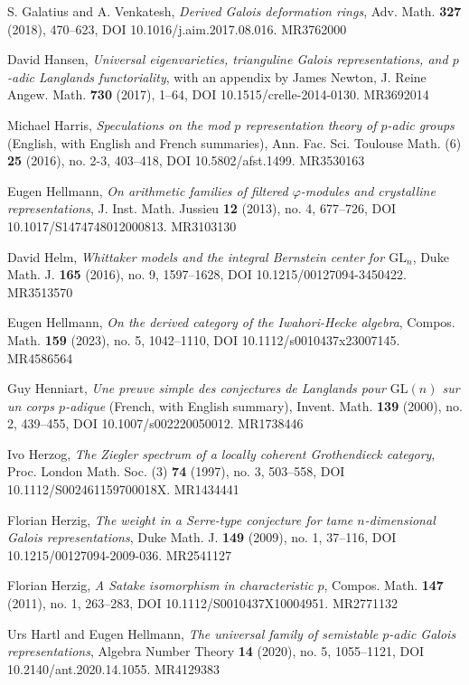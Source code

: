 \item[{[GV18]}] S. Galatius and A. Venkatesh, \emph{Derived Galois deformation rings}, Adv. Math. \textbf{327} (2018), 470--623, DOI 10.1016/j.aim.2017.08.016. MR3762000
\item[{[Han17]}] David Hansen, \emph{Universal eigenvarieties, trianguline Galois representations, and $p$-adic Langlands functoriality}, with an appendix by James Newton, J. Reine Angew. Math. \textbf{730} (2017), 1--64, DOI 10.1515/crelle-2014-0130. MR3692014
\item[{[Har16]}] Michael Harris, \emph{Speculations on the mod $p$ representation theory of $p$-adic groups} (English, with English and French summaries), Ann. Fac. Sci. Toulouse Math. (6) \textbf{25} (2016), no. 2-3, 403--418, DOI 10.5802/afst.1499. MR3530163
\item[{[Hel13]}] Eugen Hellmann, \emph{On arithmetic families of filtered $\varphi$-modules and crystalline representations}, J. Inst. Math. Jussieu \textbf{12} (2013), no. 4, 677--726, DOI 10.1017/S1474748012000813. MR3103130
\item[{[Hel16]}] David Helm, \emph{Whittaker models and the integral Bernstein center for $\mathrm{GL}_n$}, Duke Math. J. \textbf{165} (2016), no. 9, 1597--1628, DOI 10.1215/00127094-3450422. MR3513570
\item[{[Hel23]}] Eugen Hellmann, \emph{On the derived category of the Iwahori-Hecke algebra}, Compos. Math. \textbf{159} (2023), no. 5, 1042--1110, DOI 10.1112/s0010437x23007145. MR4586564
\item[{[Hen00]}] Guy Henniart, \emph{Une preuve simple des conjectures de Langlands pour $\mathrm{GL}(n)$ sur un corps $p$-adique} (French, with English summary), Invent. Math. \textbf{139} (2000), no. 2, 439--455, DOI 10.1007/s002220050012. MR1738446
\item[{[Her97]}] Ivo Herzog, \emph{The Ziegler spectrum of a locally coherent Grothendieck category}, Proc. London Math. Soc. (3) \textbf{74} (1997), no. 3, 503--558, DOI 10.1112/S002461159700018X. MR1434441
\item[{[Her09]}] Florian Herzig, \emph{The weight in a Serre-type conjecture for tame $n$-dimensional Galois representations}, Duke Math. J. \textbf{149} (2009), no. 1, 37--116, DOI 10.1215/00127094-2009-036. MR2541127
\item[{[Her11]}] Florian Herzig, \emph{A Satake isomorphism in characteristic $p$}, Compos. Math. \textbf{147} (2011), no. 1, 263--283, DOI 10.1112/S0010437X10004951. MR2771132
\item[{[HH20]}] Urs Hartl and Eugen Hellmann, \emph{The universal family of semistable $p$-adic Galois representations}, Algebra Number Theory \textbf{14} (2020), no. 5, 1055--1121, DOI 10.2140/ant.2020.14.1055. MR4129383
